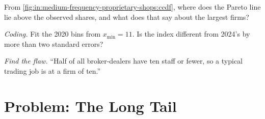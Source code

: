 \begin{exercise}[$\star\star$]\label{exo:in:medium-frequency-proprietary-shops:6}
From \cref{fig:in:medium-frequency-proprietary-shops:ccdf}, where does the Pareto line lie above the observed shares,
and what does that say about the largest firms?
\end{exercise}

\begin{exercise}[$\star\star\star$]\label{exo:in:medium-frequency-proprietary-shops:7}
\emph{Coding.} Fit the 2020 bins from $x_{\min}=11$. Is the index different from 2024's by more than two standard errors?
\end{exercise}

\begin{exercise}[$\star\star\star$]\label{exo:in:medium-frequency-proprietary-shops:8}
\emph{Find the flaw.} ``Half of all broker-dealers have ten staff or fewer, so a typical trading job is at a firm of
ten.''
\end{exercise}

\section{Problem: The Long Tail}

